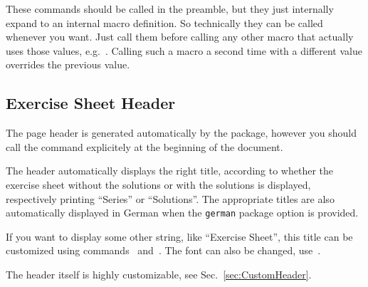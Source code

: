\documentclass[11pt,a4paper]{article}
\begin{document}

\begin{pkgtip}
  These commands should be called in the preamble, but they just internally expand to an
  internal macro definition. So technically they can be called whenever you want. Just
  call them before calling any other macro that actually uses those values,
  e.g.~. Calling such a macro a second time with a different
  value overrides the previous value.
\end{pkgtip}






\subsection{Exercise Sheet Header}
\label{sec:Header}

The page header is generated automatically by the package, however you should call the
command  explicitely at the beginning of the document.


The header automatically displays the right title, according to whether the exercise sheet
without the solutions or with the solutions is displayed, respectively printing ``Series''
or ``Solutions''. The appropriate titles are also automatically displayed in German when
the \texttt{german} package option is provided.

\begin{pkgtip}
  If you want to display some other string,
  like ``Exercise Sheet'', this title can be customized using
  commands~ and~. The
  font can also be changed, use~.

  The header itself is highly customizable, see Sec.~\ref{sec:CustomHeader}.
\end{pkgtip}
\end{document}
